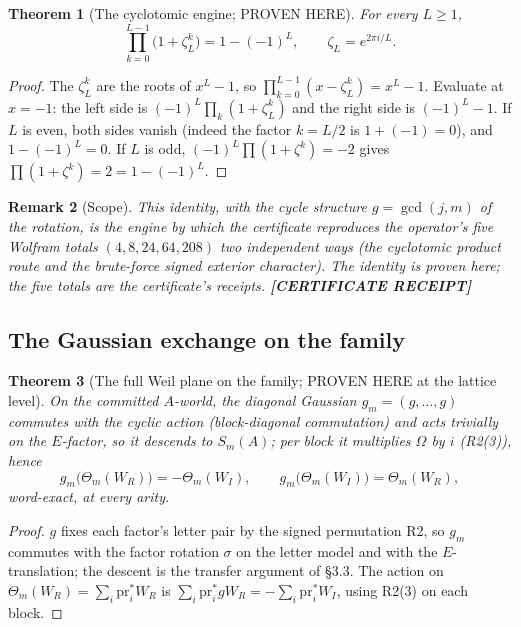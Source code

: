 \documentclass[11pt]{article}
\newtheorem{theorem}{Theorem}
\newtheorem{remark}[theorem]{Remark}
\begin{document}
\begin{theorem}[The cyclotomic engine; PROVEN HERE]
For every $L\ge1$,
\[
\prod_{k=0}^{L-1}\big(1+\zeta_L^k\big)=1-(-1)^L,
\qquad \zeta_L=e^{2\pi i/L}.
\]
\end{theorem}

\begin{proof}
The $\zeta_L^k$ are the roots of $x^L-1$, so
$\prod_{k=0}^{L-1}(x-\zeta_L^k)=x^L-1$. Evaluate at $x=-1$:
the left side is $(-1)^L\prod_k(1+\zeta_L^k)$ and the right side is
$(-1)^L-1$. If $L$ is even, both sides vanish (indeed the factor
$k=L/2$ is $1+(-1)=0$), and $1-(-1)^L=0$. If $L$ is odd,
$(-1)^L\prod(1+\zeta^k)=-2$ gives $\prod(1+\zeta^k)=2=1-(-1)^L$.
\end{proof}

\begin{remark}[Scope]
This identity, with the cycle structure $g=\gcd(j,m)$ of the rotation,
is the engine by which the certificate reproduces the operator's five
Wolfram totals $(4,8,24,64,208)$ two independent ways (the cyclotomic
product route and the brute-force signed exterior character). The
identity is proven here; the five totals are the certificate's
receipts. \textbf{[CERTIFICATE RECEIPT]}
\end{remark}

\subsection{The Gaussian exchange on the family}

\begin{theorem}[The full Weil plane on the family; PROVEN HERE at the
lattice level]
On the committed $A$-world, the diagonal Gaussian
$g_m=(g,\dots,g)$ commutes with the cyclic action (block-diagonal
commutation) and acts trivially on the $E$-factor, so it descends to
$S_m(A)$; per block it multiplies $\Omega$ by $i$
(R2(3)), hence
\[
g_m\big(\Theta_m(W_R)\big)=-\Theta_m(W_I),\qquad
g_m\big(\Theta_m(W_I)\big)=\Theta_m(W_R),
\]
word-exact, at every arity.
\end{theorem}

\begin{proof}
$g$ fixes each factor's letter pair by the signed permutation R2, so
$g_m$ commutes with the factor rotation $\sigma$ on the letter model
and with the $E$-translation; the descent is the transfer argument of
\S3.3. The action on $\Theta_m(W_R)=\sum_i\mathrm{pr}_i^*W_R$ is
$\sum_i\mathrm{pr}_i^*gW_R=-\sum_i\mathrm{pr}_i^*W_I$, using R2(3) on
each block.
\end{proof}
\end{document}
